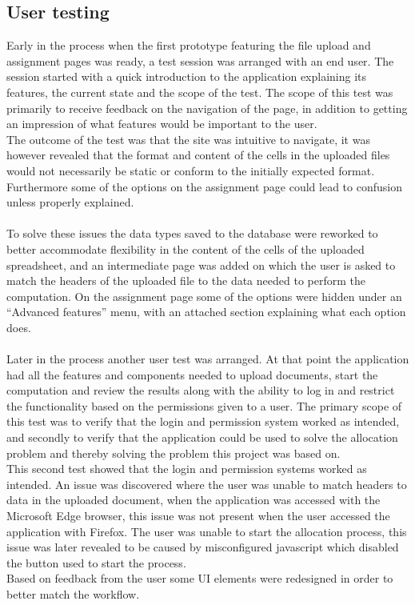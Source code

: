 \subsection{User testing}
Early in the process when the first prototype featuring the file upload and assignment pages was ready, a test session was arranged with an end user. The session started with a quick introduction to the application explaining its features, the current state and the scope of the test. The scope of this test was primarily to receive feedback on the navigation of the page, in addition to getting an impression of what features would be important to the user.\\
The outcome of the test was that the site was intuitive to navigate, it was however revealed that the format and content of the cells in the uploaded files would not necessarily be static or conform to the initially expected format. Furthermore some of the options on the assignment page could lead to confusion unless properly explained.\\\\
To solve these issues the data types saved to the database were reworked to better accommodate flexibility in the content of the cells of the uploaded spreadsheet, and an intermediate page was added on which the user is asked to match the headers of the uploaded file to the data needed to perform the computation. On the assignment page some of the options were hidden under an ``Advanced features'' menu, with an attached section explaining what each option does.\\\\
Later in the process another user test was arranged. At that point the application had all the features and components needed to upload documents, start the computation and review the results along with the ability to log in and restrict the functionality based on the permissions given to a user. The primary scope of this test was to verify that the login and permission system worked as intended, and secondly to verify that the application could be used to solve the allocation problem and thereby solving the problem this project was based on.\\
This second test showed that the login and permission systems worked as intended. An issue was discovered where the user was unable to match headers to data in the uploaded document, when the application was accessed with the Microsoft Edge browser, this issue was not present when the user accessed the application with Firefox. The user was unable to start the allocation process, this issue was later revealed to be caused by misconfigured javascript which disabled the button used to start the process.
\\Based on feedback from the user some UI elements were redesigned in order to better match the workflow.
